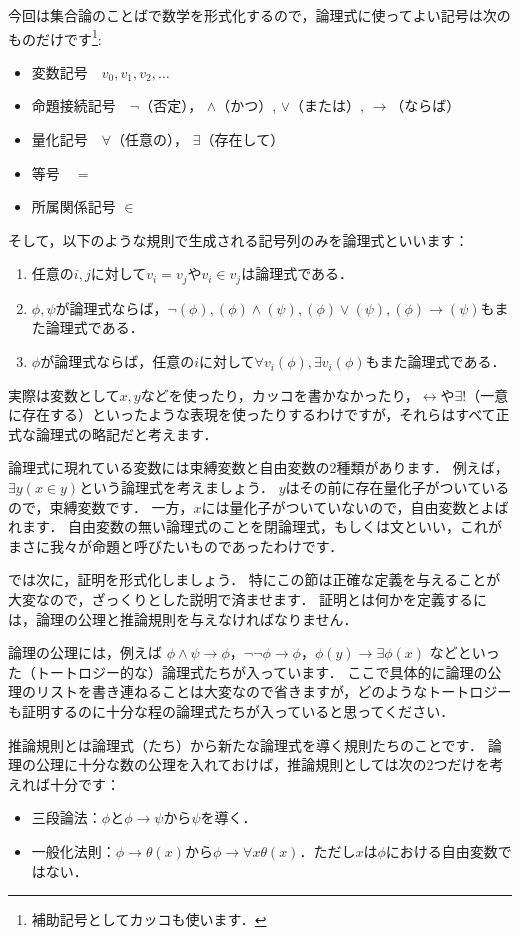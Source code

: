 \documentclass[./main]{subfiles}
\begin{document}
今回は集合論のことばで数学を形式化するので，論理式に使ってよい記号は次のものだけです\footnote{補助記号としてカッコも使います．}:
\begin{itemize}
\item 変数記号　$v_{0}, v_{1}, v_{2}, \ldots$
\item 命題接続記号　$\neg$（否定）， $\land$（かつ）, $\lor$（または）, $\to$（ならば）
\item 量化記号　$\forall$（任意の）， $\exists$（存在して）
\item 等号　$=$
\item 所属関係記号 $\in$
\end{itemize}
そして，以下のような規則で生成される記号列のみを論理式といいます：
\begin{enumerate}
\item 任意の$i, j$に対して$v_i = v_j$や$v_i\in v_j$は論理式である．
\item $\phi, \psi$が論理式ならば，$\neg(\phi), (\phi)\land(\psi), (\phi)\lor(\psi), (\phi)\to(\psi)$もまた論理式である．
\item $\phi$が論理式ならば，任意の$i$に対して$\forall v_i(\phi),\exists v_i(\phi)$もまた論理式である．
\end{enumerate}
実際は変数として$x, y$などを使ったり，カッコを書かなかったり，$\leftrightarrow$や$\exists !$（一意に存在する）といったような表現を使ったりするわけですが，それらはすべて正式な論理式の略記だと考えます．

論理式に現れている変数には束縛変数と自由変数の2種類があります．
例えば，$\exists y (x\in y)$という論理式を考えましょう．
$y$はその前に存在量化子がついているので，束縛変数です．
一方，$x$には量化子がついていないので，自由変数とよばれます．
自由変数の無い論理式のことを閉論理式，もしくは文といい，これがまさに我々が命題と呼びたいものであったわけです．


では次に，証明を形式化しましょう．
特にこの節は正確な定義を与えることが大変なので，ざっくりとした説明で済ませます．
証明とは何かを定義するには，論理の公理と推論規則を与えなければなりません．

論理の公理には，例えば
$\phi\land\psi\to\phi$，$\neg\neg\phi\to\phi$，$\phi(y)\to\exists\phi(x)$
などといった（トートロジー的な）論理式たちが入っています．
ここで具体的に論理の公理のリストを書き連ねることは大変なので省きますが，どのようなトートロジーも証明するのに十分な程の論理式たちが入っていると思ってください．

推論規則とは論理式（たち）から新たな論理式を導く規則たちのことです．
論理の公理に十分な数の公理を入れておけば，推論規則としては次の2つだけを考えれば十分です：
\begin{itemize}
\item 三段論法：$\phi$と$\phi\to\psi$から$\psi$を導く．
\item 一般化法則：$\phi\to\theta(x)$から$\phi\to\forall x\theta(x)$．ただし$x$は$\phi$における自由変数ではない．
 \end{itemize}
\end{document}
